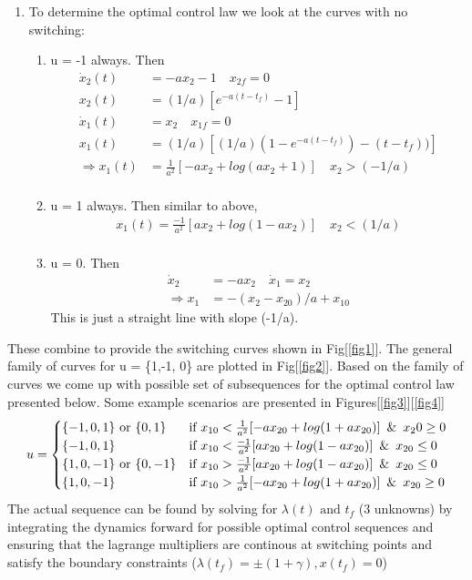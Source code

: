 \begin{enumerate}
\begin{enumerate}
  \item To determine the optimal control law we look at the curves with no switching:
   \begin{enumerate}
    \item u = -1 always. Then 
    \begin{align*}
     \dot x_2(t) &= -a x_2 - 1 \quad x_{2f} = 0\\
     x_2(t) &= (1/a) [e^{-a(t-t_f)} - 1]\\
     \dot x_1(t) &= x_2 \quad x_{1f} = 0\\
     x_1(t) &= (1/a) [(1/a)(1 - e^{-a(t-t_f)}) - (t-t_f))]\\
     \Rightarrow x_1(t) &= \frac{1}{a^2} [-ax_2 + log(ax_2 + 1)] \quad x_2 > (-1/a)\\
    \end{align*}
    \item u = 1 always. Then similar to above,
    \begin{align*}
      x_1(t) = \frac{-1}{a^2} [ax_2 + log(1 - ax_2)] \quad x_2 < (1/a)\\
    \end{align*}
    \item u = 0. Then
    \begin{align*}
     \dot x_2 &= -a x_2 \quad \dot x_1 = x_2 \\
     \Rightarrow x_1 &= -(x_2 - x_{20})/a  + x_{10}
    \end{align*}
    This is just a straight line with slope (-1/a).
   \end{enumerate}
  \end{enumerate}
   These combine to provide the switching curves shown in Fig[\ref{fig1}]. The general family of curves for u = \{1,-1, 0\} are
plotted in Fig[\ref{fig2}]. Based on the family of curves we come up with possible set of subsequences for the optimal control law presented below. Some example scenarios are presented in Figures[\ref{fig3}][\ref{fig4}]
    \begin{align*}
     u = \begin{cases}
          \{-1,0,1 \} \mbox{ or } \{0,1 \} & \mbox{if } x_{10} < \frac{1}{a^2} [-ax_{20} + log(1 + ax_{20})] \enskip\&\enskip x_20 \ge 0\\
          \{-1,0,1 \}  & \mbox{if } x_{10} < \frac{-1}{a^2} [ax_{20} + log(1 - ax_{20})]\enskip\&\enskip x_{20} \le 0\\
          \{1,0,-1 \} \mbox{ or } \{0,-1 \} & \mbox{if } x_{10} > \frac{-1}{a^2} [ax_{20} + log(1 - ax_{20})] \enskip\&\enskip x_{20} \le 0\\
          \{1,0,-1 \}  & \mbox{if } x_{10} > \frac{1}{a^2} [-ax_{20} + log(1 + ax_{20})] \enskip\&\enskip x_{20} \ge 0\\
         \end{cases}\\
    \end{align*}
    The actual sequence can be found by solving for $\lambda(t) \mbox{ and } t_f$  (3 unknowns) by integrating the dynamics forward for possible optimal control sequences and ensuring that the lagrange multipliers are continous at switching points and satisfy the boundary constraints ($\lambda(t_f) = \pm (1+\gamma), x(t_f) = 0$)


\end{enumerate}
